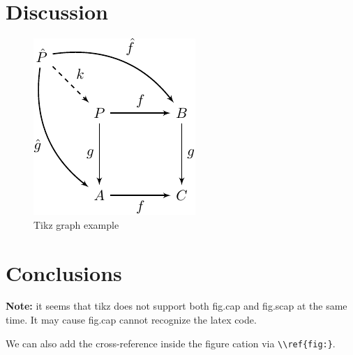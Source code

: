 \documentclass[
  letterpaper,
  DIV=11,
  numbers=noendperiod]{scrartcl}
\begin{document}
\hypertarget{discussion}{%
\section{Discussion}\label{discussion}}

\begin{figure}

{\centering \includegraphics{figures/simpletikz-1.pdf}

}

\caption{Tikz graph example}

\end{figure}

\hypertarget{conclusions}{%
\section{Conclusions}\label{conclusions}}

\textbf{Note:} it seems that tikz does not support both fig.cap and
fig.scap at the same time. It may cause fig.cap cannot recognize the
latex code.

We can also add the cross-reference inside the figure cation via
\texttt{\textbackslash{}\textbackslash{}ref\{fig:\}}.

\clearpage


\printbibliography[title=References]
\end{document}
